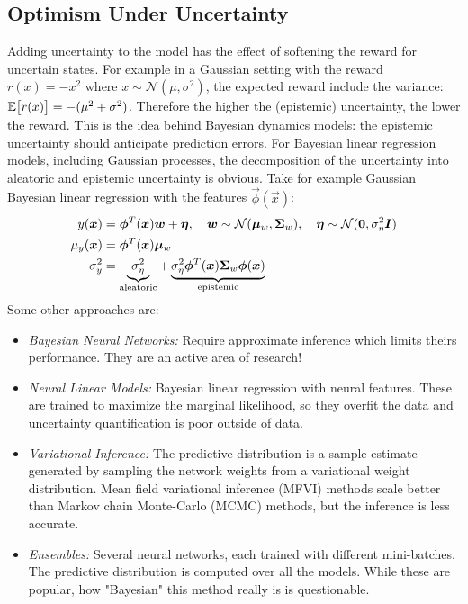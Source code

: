 		\subsection{Optimism Under Uncertainty}
			Adding uncertainty to the model has the effect of softening the reward for uncertain states. For example in a Gaussian setting with the reward \( r(x) = -x^2 \) where \( x \sim \mathcal{N}(\mu, \sigma^2) \), the expected reward include the variance: \( \mathbb{E}\big[r(x)\big] = -(\mu^2 +\sigma^2) \). Therefore the higher the (epistemic) uncertainty, the lower the reward. This is the idea behind Bayesian dynamics models: the epistemic uncertainty should anticipate prediction errors. For Bayesian linear regression models, including Gaussian processes, the decomposition of the uncertainty into aleatoric and epistemic uncertainty is obvious. Take for example Gaussian Bayesian linear regression with the features \( \vec{\phi}(\vec{x}) \):
			\begin{align*}
				y(\bm{x})     & = \bm{\phi}^T(\bm{x}) \bm{w} + \bm{\eta},\quad
				\bm{w} \sim \mathcal{N}(\bm{\mu}_w, \bm{\Sigma}_w),\quad
				\bm{\eta} \sim \mathcal{N}(\bm{0}, \sigma_\eta^2 \bm{I})                                                                                                           \\
				\mu_y(\bm{x}) & = \bm{\phi}^T(\bm{x}) \bm{\mu}_w                                                                                                                  \\
				\sigma_y^2     & = \underbrace{\sigma_\eta^2}_\text{aleatoric} + \underbrace{\sigma_\eta^2 \bm{\phi}^T(\bm{x}) \bm{\Sigma}_w \bm{\phi}(\bm{x})}_\text{epistemic}
			\end{align*}
			Some other approaches are:
			\begin{itemize}
				\item \emph{Bayesian Neural Networks:} Require approximate inference which limits theirs performance. They are an active area of research!
				\item \emph{Neural Linear Models:} Bayesian linear regression with neural features. These are trained to maximize the marginal likelihood, so they overfit the data and uncertainty quantification is poor outside of data.
				\item \emph{Variational Inference:} The predictive distribution is a sample estimate generated by sampling the network weights from a variational weight distribution. Mean field variational inference (MFVI) methods scale better than Markov chain Monte-Carlo (MCMC) methods, but the inference is less accurate.
				\item \emph{Ensembles:} Several neural networks, each trained with different mini-batches. The predictive distribution is computed over all the models. While these are popular, how "Bayesian" this method really is is questionable.
			\end{itemize}

